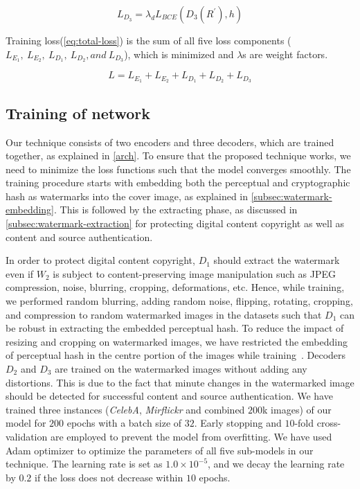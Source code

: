 \documentclass[acmsmall, nonacm]{acmart}
\begin{document}
\begin{equation}\label{eq:decoder3loss}
  L_{D_3} = \lambda_d L_{BCE}(D_3(R^{\prime}),h)
\end{equation}

Training loss(\autoref{eq:total-loss}) is the sum of all five loss components ($L_{E_1},\: L_{E_2},\: L_{D_1},\: L_{D_2}, and \: L_{D_3}$), which is minimized and $\lambda$s are weight factors.

\begin{equation}\label{eq:total-loss}
  L= L_{E_1} + L_{E_2}+ L_{D_1} + L_{D_2} + L_{D_3}
\end{equation}

\subsection{Training of network}\label{subsec:training-of-network}

Our technique consists of two encoders and three decoders, which are trained together, as explained in \autoref{arch}. To ensure that the proposed technique works, we need to minimize the loss functions such that the model converges smoothly. The training procedure starts with embedding both the perceptual and cryptographic hash as watermarks into the cover image, as explained in \autoref{subsec:watermark-embedding}. This is followed by the extracting phase, as discussed in \autoref{subsec:watermark-extraction} for protecting digital content copyright as well as content and source authentication.

In order to protect digital content copyright, $D_1$ should extract the watermark even if $W_2$ is subject to content-preserving image manipulation such as JPEG compression, noise, blurring, cropping, deformations, etc. Hence, while training,  we performed random blurring, adding random noise, flipping, rotating, cropping, and compression to random watermarked images in the datasets such that $D_1$ can be robust in extracting the embedded perceptual hash. To reduce the impact of resizing and cropping on watermarked images,  we have restricted the embedding of perceptual hash in the centre portion of the images while training~\cite{stegastamp}. Decoders $D_2$ and $D_3$ are trained on the watermarked images without adding any distortions. This is due to the fact that minute changes in the watermarked image should be detected for successful content and source authentication.  We have trained three instances ({\em CelebA},  {\em Mirflickr} and combined $200$k images) of our model for $200$ epochs with a batch size of $32$. Early stopping and  $10$-fold cross-validation are employed to prevent the model from overfitting.  We have used Adam optimizer to optimize the parameters of all five sub-models in our technique. The learning rate is set as $1.0 \times 10^{-5}$, and we decay the learning rate by $0.2$ if the loss does not decrease within $10$ epochs.
\end{document}
